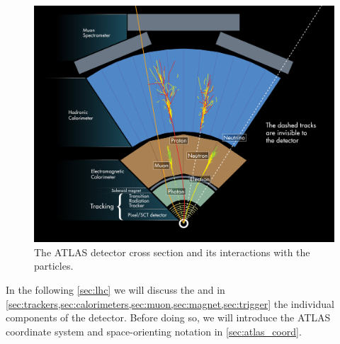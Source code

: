 \begin{figure}[htb]
    \centering
    \includegraphics[width=0.9\linewidth]{src/img/det_interactions.jpg}
    \caption{The ATLAS detector cross section and its interactions with the particles.}
    \label{fig:det_inter}
\end{figure}

In the following \cref{sec:lhc} we will discuss the \LHC and in \cref{sec:trackers,sec:calorimeters,sec:muon,sec:magnet,sec:trigger} the individual components of the detector.
Before doing so, we will introduce the ATLAS coordinate system and space-orienting notation in \cref{sec:atlas_coord}.
